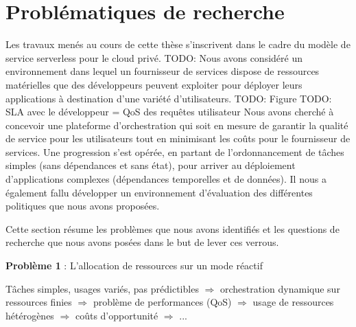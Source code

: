 
\section{Problématiques de recherche}

Les travaux menés au cours de cette thèse s'inscrivent dans le cadre du modèle de service serverless pour le cloud privé.
TODO: Nous avons considéré un environnement dans lequel un fournisseur de services dispose de ressources matérielles que des développeurs peuvent exploiter pour déployer leurs applications à destination d'une variété d'utilisateurs.
TODO: Figure
TODO: SLA avec le développeur = QoS des requêtes utilisateur
Nous avons cherché à concevoir une plateforme d'orchestration qui soit en mesure de garantir la qualité de service pour les utilisateurs tout en minimisant les coûts pour le fournisseur de services. Une progression s'est opérée, en partant de l'ordonnancement de tâches simples (sans dépendances et sans état), pour arriver au déploiement d'applications complexes (dépendances temporelles et de données). Il nous a également fallu développer un environnement d'évaluation des différentes politiques que nous avons proposées.

Cette section résume les problèmes que nous avons identifiés et les questions de recherche que nous avons posées dans le but de lever ces verrous.


\textbf{Problème 1} : L'allocation de ressources sur un mode réactif

Tâches simples, usages variés, pas prédictibles $\Rightarrow$ orchestration dynamique sur ressources finies $\Rightarrow$ problème de performances (QoS) $\Rightarrow$ usage de ressources hétérogènes $\Rightarrow$ coûts d'opportunité $\Rightarrow$ ...



